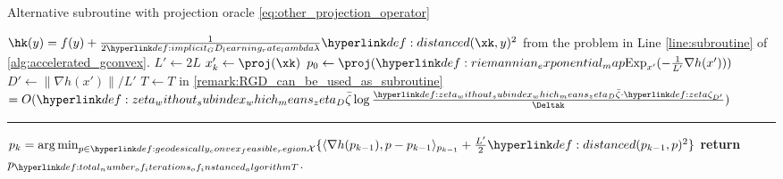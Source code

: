 \documentclass[12pt]{alt2021}
\newcommand{\norm}[1]{\| #1 \|}
\DeclareMathOperator*{\argmin}{arg\,min}
\newcommand{\innp}[1]{\langle #1 \rangle}
\newcommand{\bigo}[1]{O( #1 )}
\begin{document}
\begin{algorithm}
    \caption{Alternative subroutine with projection oracle \eqref{eq:other_projection_operator}}
    \label{alg:other_subroutine}

\begin{algorithmic}[1] 
    \REQUIRE $\hk(y)  = f(y) + \frac{1}{2\lambda} \dist(\xk, y)^2$ from the problem in Line \ref{line:subroutine} of \cref{alg:accelerated_gconvex}.
    \vspace{0.1cm}
    \State $L' \gets 2L $ 
    \State $x_k' \gets \proj(\xk)$
    \State $p_0 \gets \proj(\expon{x'}(-\frac{1}{L'}\nabla h(x')))$
    \State $D' \gets \norm{\nabla h(x')}/L'$
    \State $T \gets T$ in \cref{remark:RGD_can_be_used_as_subroutine} $= \bigo{\zetad \log \frac{\zetad\cdot\zeta{D'}}{\Deltak}}$
    \hrule
    \vspace{0.1cm}
    \State $p_{k} = \argmin_{p\in\X}\{\innp{\nabla h(p_{k-1}), p-p_{k-1}}_{p_{k-1}} + \frac{L'}{2}\dist(p_{k-1}, p)^2\}$  
    \ENDFOR
    \State \textbf{return} $p_{\TT}$.
\end{algorithmic}
\end{algorithm}
\end{document}
